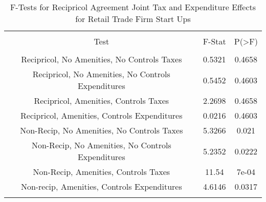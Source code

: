 
\begin{table}[!htbp] \centering 
  \caption{F-Tests for Recipricol Agreement Joint Tax and Expenditure Effects for Retail Trade Firm Start Ups} 
  \label{44-45Ftests} 
\begin{tabular}{@{\extracolsep{5pt}} ccc} 
\\[-1.8ex]\hline 
\hline \\[-1.8ex] 
Test & F-Stat & P(\textgreater F) \\ 
\hline \\[-1.8ex] 
Recipricol, No Amenities, No Controls Taxes & 0.5321 & 0.4658 \\ 
Recipricol, No Amenities, No Controls Expenditures & 0.5452 & 0.4603 \\ 
Recipricol, Amenities, Controls Taxes & 2.2698 & 0.4658 \\ 
Recipricol, Amenities, Controls Expenditures & 0.0216 & 0.4603 \\ 
Non-Recip, No Amenities, No Controls Taxes & 5.3266 & 0.021 \\ 
Non-Recip, No Amenities, No Controls Expenditures & 5.2352 & 0.0222 \\ 
Non-Recip, Amenities, Controls Taxes & 11.54 & 7e-04 \\ 
Non-recip, Amenities, Controls Expenditures & 4.6146 & 0.0317 \\ 
\hline \\[-1.8ex] 
\end{tabular} 
\end{table} 
